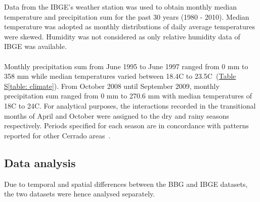 \documentclass[11pt]{article}
\begin{document}
Data from the IBGE's weather station was used to obtain monthly median temperature and precipitation sum for the past 30 years (1980 - 2010). Median temperature was adopted as monthly distributions of daily average temperatures were skewed. Humidity was not considered as only relative humidity data of IBGE was available.\\
\\
Monthly precipitation sum from June 1995 to June 1997 ranged from 0 mm to 358 mm while median temperatures varied between 18.4\degree C to 23.5\degree C~(\hyperref[table: climate]{Table S\ref{table: climate}}). From October 2008 until September 2009, monthly precipitation sum ranged from 0 mm to 270.6 mm with median temperatures of 18\degree C to 24\degree C. For analytical purposes, the interactions recorded in the transitional months of April and October were assigned to the dry and rainy seasons respectively. Periods specified for each season are in concordance with patterns reported for other Cerrado areas~\citep{Gottsberger2006a}. 

\subsection{Data analysis}
Due to temporal and spatial differences between the BBG and IBGE datasets, the two datasets were hence analysed separately. 
\end{document}

